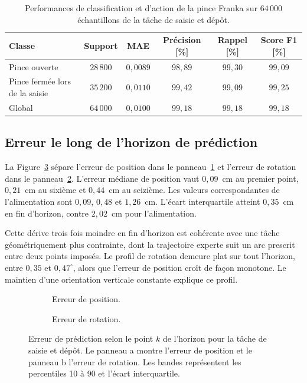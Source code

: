 \begin{table}[!htbp]
\centering
\caption[Performances de classification et d'action de la pince]{Performances de classification et d'action de la pince Franka sur $64\,000$ échantillons de la tâche de saisie et dépôt.}
\label{tab:gripper_stats}
\small
\begin{tabular}{lccccc}
\toprule
Classe & Support & MAE & Précision [\%] & Rappel [\%] & Score F1 [\%] \\
\midrule
Pince ouverte & $28\,800$ & $0{,}0089$ & $98{,}89$ & $99{,}30$ & $99{,}09$ \\
Pince fermée lors de la saisie & $35\,200$ & $0{,}0110$ & $99{,}42$ & $99{,}09$ & $99{,}25$ \\
\midrule
Global & $64\,000$ & $0{,}0100$ & $99{,}18$ & $99{,}18$ & $99{,}18$ \\
\bottomrule
\end{tabular}
\end{table}

\subsection*{Erreur le long de l'horizon de prédiction}

La Figure~\ref{fig:pp_err_horizon} sépare l'erreur de position dans le panneau~\ref{fig:pp_err_horizon_pos} et l'erreur de rotation dans le panneau~\ref{fig:pp_err_horizon_rot}. L'erreur médiane de position vaut $0{,}09$~cm au premier point, $0{,}21$~cm au sixième et $0{,}44$~cm au seizième. Les valeurs correspondantes de l'alimentation sont $0{,}09$, $0{,}48$ et $1{,}26$~cm. L'écart interquartile atteint $0{,}35$~cm en fin d'horizon, contre $2{,}02$~cm pour l'alimentation.

Cette dérive trois fois moindre en fin d'horizon est cohérente avec une tâche géométriquement plus contrainte, dont la trajectoire experte suit un arc prescrit entre deux points imposés. Le profil de rotation demeure plat sur tout l'horizon, entre $0{,}35$ et $0{,}47^\circ$, alors que l'erreur de position croît de façon monotone. Le maintien d'une orientation verticale constante explique ce profil.

\begin{figure}[!htbp]
    \centering
    \begin{subfigure}[b]{0.48\textwidth}
        \centering
        
        \caption{Erreur de position.}\label{fig:pp_err_horizon_pos}
    \end{subfigure}
    \hfill
    \begin{subfigure}[b]{0.48\textwidth}
        \centering
        
        \caption{Erreur de rotation.}\label{fig:pp_err_horizon_rot}
    \end{subfigure}
    \caption{Erreur de prédiction selon le point $k$ de l'horizon pour la tâche de saisie et dépôt. Le panneau a montre l'erreur de position et le panneau b l'erreur de rotation. Les bandes représentent les percentiles 10 à 90 et l'écart interquartile.}\label{fig:pp_err_horizon}
\end{figure}

